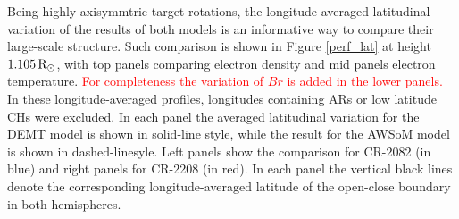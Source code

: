 \documentclass[namedreferences]{solarphysics}
\newcommand{\mrsun}{{\rm R_\odot}}
\def\diego#1{\textcolor{red}{#1}}
\begin{document}
\begin{article}
{Being highly axisymmtric target rotations, the longitude-averaged latitudinal variation of the results of both models is an informative way to compare their large-scale structure. Such comparison is shown in Figure \ref{perf_lat} at height $1.105\,\mrsun$, with top panels comparing electron density and mid panels electron temperature. \diego{For completeness the variation of $Br$ is added in the lower panels.} In these longitude-averaged profiles, longitudes containing ARs or low latitude CHs were excluded. In each panel the averaged latitudinal variation for the DEMT model is shown in solid-line style, while the result for the AWSoM model is shown in dashed-linesyle. Left panels show the comparison for CR-2082 (in blue) and right panels for CR-2208 (in red). In each panel the vertical black lines denote the corresponding longitude-averaged latitude of the open-close boundary in both hemispheres.}


\end{article}
\end{document}
